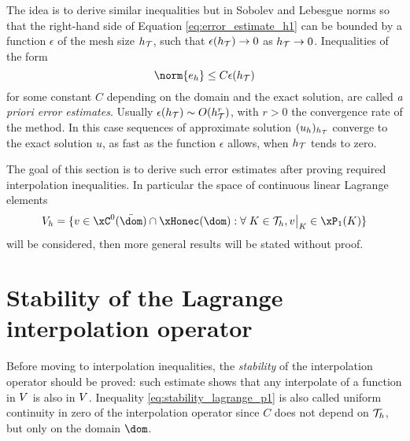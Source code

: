 \medskip
The idea is to derive similar inequalities but in Sobolev and Lebesgue norms so that the right-hand side of Equation \eqref{eq:error_estimate_h1} can be bounded by a function $\epsilon$ of the mesh size $h_{\mathcal T}$, such that $\epsilon(h_{\mathcal T}) \rightarrow 0$ as $h_{\mathcal T} \rightarrow 0$.
Inequalities of the form
\begin{equation*}
\norm{e_h} \leq C \epsilon(\sizeT)
\end{equation*}
for some constant $C$ depending on the domain and the exact solution, are called \textit{a priori error estimates}.
Usually $\epsilon(h_{\mathcal T}) \sim O(h_{\mathcal T}^r)$, with $r > 0$ the convergence rate of the method.
In this case sequences of approximate solution $(u_h)_{h_{\mathcal T}}$ converge to the exact solution $u$, as fast as the function $\epsilon$ allows, when $h_{\mathcal T}$ tends to zero.

\medskip
The goal of this section is to derive such error estimates after proving required interpolation inequalities.
In particular the space of continuous linear Lagrange elements
\begin{equation}\label{sp:lagrangeP1}
\xVh = \lbrace v \in \xC^0(\bar\dom)\cap\xHonec(\dom) : \forany K \in \meshT, \Restrict{v}{K} \in \xPone(K) \rbrace
\end{equation}
will be considered, then more general results will be stated without proof.

\section{Stability of the Lagrange interpolation operator}

Before moving to interpolation inequalities, the \textit{stability} of the interpolation operator should be proved: such estimate shows that any interpolate of a function in ${V}$ is also in ${V}$.
Inequality \eqref{eq:stability_lagrange_p1} is also called uniform continuity in zero of the interpolation operator since $C$ does not depend on ${\mathcal T}_h$, but only on the domain $\dom$.

